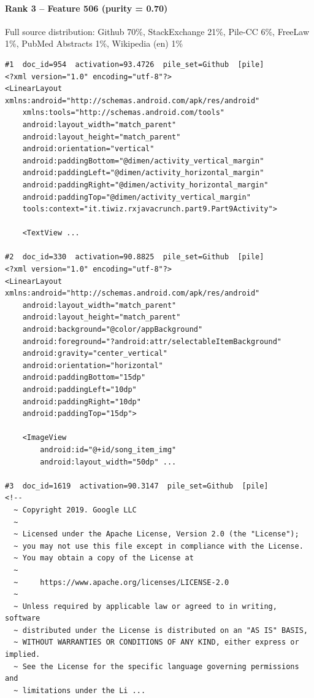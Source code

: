\paragraph*{Rank 3 -- Feature 506 (purity = 0.70)}

Full source distribution: Github 70\%, StackExchange 21\%, Pile-CC 6\%, FreeLaw 1\%, PubMed Abstracts 1\%, Wikipedia (en) 1\%

\begin{verbatim}
#1  doc_id=954  activation=93.4726  pile_set=Github  [pile]
<?xml version="1.0" encoding="utf-8"?>
<LinearLayout xmlns:android="http://schemas.android.com/apk/res/android"
    xmlns:tools="http://schemas.android.com/tools"
    android:layout_width="match_parent"
    android:layout_height="match_parent"
    android:orientation="vertical"
    android:paddingBottom="@dimen/activity_vertical_margin"
    android:paddingLeft="@dimen/activity_horizontal_margin"
    android:paddingRight="@dimen/activity_horizontal_margin"
    android:paddingTop="@dimen/activity_vertical_margin"
    tools:context="it.tiwiz.rxjavacrunch.part9.Part9Activity">

    <TextView ...

#2  doc_id=330  activation=90.8825  pile_set=Github  [pile]
<?xml version="1.0" encoding="utf-8"?>
<LinearLayout xmlns:android="http://schemas.android.com/apk/res/android"
    android:layout_width="match_parent"
    android:layout_height="match_parent"
    android:background="@color/appBackground"
    android:foreground="?android:attr/selectableItemBackground"
    android:gravity="center_vertical"
    android:orientation="horizontal"
    android:paddingBottom="15dp"
    android:paddingLeft="10dp"
    android:paddingRight="10dp"
    android:paddingTop="15dp">

    <ImageView
        android:id="@+id/song_item_img"
        android:layout_width="50dp" ...

#3  doc_id=1619  activation=90.3147  pile_set=Github  [pile]
<!--
  ~ Copyright 2019. Google LLC
  ~
  ~ Licensed under the Apache License, Version 2.0 (the "License");
  ~ you may not use this file except in compliance with the License.
  ~ You may obtain a copy of the License at
  ~
  ~     https://www.apache.org/licenses/LICENSE-2.0
  ~
  ~ Unless required by applicable law or agreed to in writing, software
  ~ distributed under the License is distributed on an "AS IS" BASIS,
  ~ WITHOUT WARRANTIES OR CONDITIONS OF ANY KIND, either express or implied.
  ~ See the License for the specific language governing permissions and
  ~ limitations under the Li ...


\end{verbatim}
